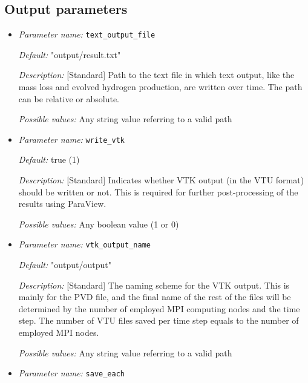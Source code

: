 \subsection{Output parameters}
\label{parameters:output}

\begin{itemize}
\item {\it Parameter name:} {\tt text\_output\_file}
\label{parameters:text_output_file}


{\it Default:} "output/result.txt"

{\it Description:} [Standard] Path to the text file in which text output, like the mass loss and evolved hydrogen production, are written over time. The path can be relative or absolute.

{\it Possible values:} Any string value referring to a valid path


\item {\it Parameter name:} {\tt write\_vtk}
\label{parameters:write_vtk}


{\it Default:} true (1)

{\it Description:} [Standard] Indicates whether VTK output (in the VTU format) should be written or not. This is required for further post-processing of the results using ParaView.

{\it Possible values:} Any boolean value (1 or 0)


\item {\it Parameter name:} {\tt vtk\_output\_name}
\label{parameters:vtk_output_name}


{\it Default:} "output/output"

{\it Description:} [Standard] The naming scheme for the VTK output. This is mainly for the PVD file, and the final name of the rest of the files will be determined by the number of employed MPI computing nodes and the time step. The number of VTU files saved per time step equals to the number of employed MPI nodes.

{\it Possible values:} Any string value referring to a valid path


\item {\it Parameter name:} {\tt save\_each}
\label{parameters:save_each}


\end{itemize}
